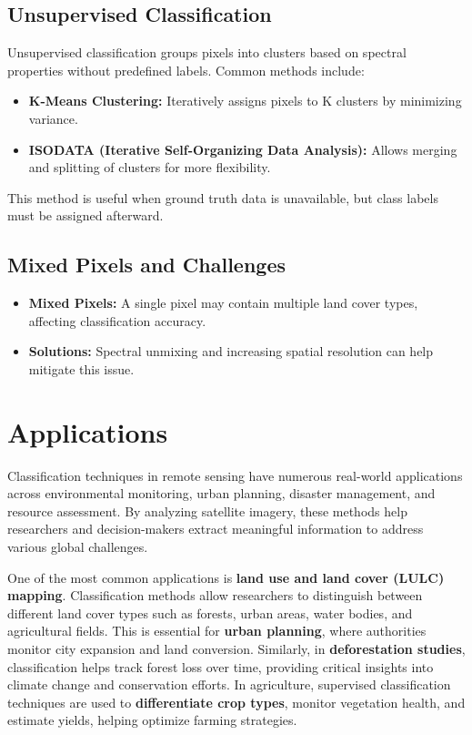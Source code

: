 \documentclass[
  letterpaper,
]{scrbook}
\begin{document}
\subsection{\texorpdfstring{\textbf{Unsupervised
Classification}}{Unsupervised Classification}}\label{unsupervised-classification}

Unsupervised classification groups pixels into clusters based on
spectral properties without predefined labels. Common methods include:

\begin{itemize}
\item
  \textbf{K-Means Clustering:} Iteratively assigns pixels to K clusters
  by minimizing variance.
\item
  \textbf{ISODATA (Iterative Self-Organizing Data Analysis):} Allows
  merging and splitting of clusters for more flexibility.
\end{itemize}

This method is useful when ground truth data is unavailable, but class
labels must be assigned afterward.

\subsection{\texorpdfstring{\textbf{Mixed Pixels and
Challenges}}{Mixed Pixels and Challenges}}\label{mixed-pixels-and-challenges}

\begin{itemize}
\item
  \textbf{Mixed Pixels:} A single pixel may contain multiple land cover
  types, affecting classification accuracy.
\item
  \textbf{Solutions:} Spectral unmixing and increasing spatial
  resolution can help mitigate this issue.
\end{itemize}

\section{Applications}\label{applications-4}

Classification techniques in remote sensing have numerous real-world
applications across environmental monitoring, urban planning, disaster
management, and resource assessment. By analyzing satellite imagery,
these methods help researchers and decision-makers extract meaningful
information to address various global challenges.

One of the most common applications is \textbf{land use and land cover
(LULC) mapping}. Classification methods allow researchers to distinguish
between different land cover types such as forests, urban areas, water
bodies, and agricultural fields. This is essential for \textbf{urban
planning}, where authorities monitor city expansion and land conversion.
Similarly, in \textbf{deforestation studies}, classification helps track
forest loss over time, providing critical insights into climate change
and conservation efforts. In agriculture, supervised classification
techniques are used to \textbf{differentiate crop types}, monitor
vegetation health, and estimate yields, helping optimize farming
strategies.
\end{document}
